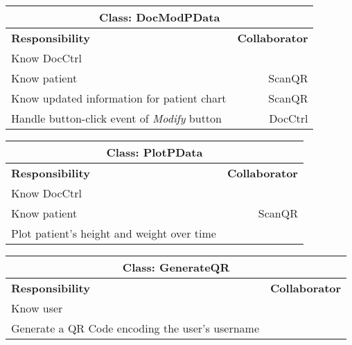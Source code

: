 \documentclass[12pt]{article}
\begin{document}
\begin{center}
\begin{tabularx}{\textwidth}{|X|r|} \hline
\multicolumn{2}{|c|}{\textbf{Class: DocModPData}}\\ \hline
\textbf{Responsibility} & \textbf{Collaborator} \\ \hline
Know DocCtrl & \\ \hline
Know patient & ScanQR \\ \hline
Know updated information for patient chart & ScanQR \\ \hline
Handle button-click event of \emph{Modify} button & DocCtrl \\ \hline
\end{tabularx}
\newline\newline
\end{center}

\begin{center}
\begin{tabularx}{\textwidth}{|X|r|} \hline
\multicolumn{2}{|c|}{\textbf{Class: PlotPData}}\\ \hline
\textbf{Responsibility} & \textbf{Collaborator} \\ \hline
Know DocCtrl & \\ \hline
Know patient & ScanQR \\ \hline
Plot patient's height and weight over time \\ \hline
\end{tabularx}
\newline\newline
\end{center}

\begin{center}
\begin{tabularx}{\textwidth}{|X|r|} \hline
\multicolumn{2}{|c|}{\textbf{Class: GenerateQR}}\\ \hline
\textbf{Responsibility} & \textbf{Collaborator} \\ \hline
Know user & \\ \hline
Generate a QR Code encoding the user's username &  \\ \hline
\end{tabularx}
\newline\newline
\end{center}
\end{document}
